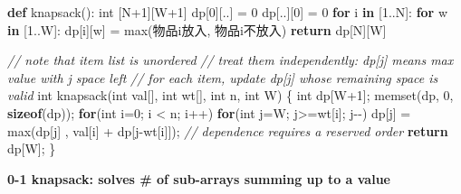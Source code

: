\documentclass[
]{article}
\newenvironment{Shaded}{}{}
\newcommand{\BuiltInTok}[1]{#1}
\newcommand{\CommentTok}[1]{\textcolor[rgb]{0.38,0.63,0.69}{\textit{#1}}}
\newcommand{\ControlFlowTok}[1]{\textcolor[rgb]{0.00,0.44,0.13}{\textbf{#1}}}
\newcommand{\DataTypeTok}[1]{\textcolor[rgb]{0.56,0.13,0.00}{#1}}
\newcommand{\DecValTok}[1]{\textcolor[rgb]{0.25,0.63,0.44}{#1}}
\newcommand{\FloatTok}[1]{\textcolor[rgb]{0.25,0.63,0.44}{#1}}
\newcommand{\KeywordTok}[1]{\textcolor[rgb]{0.00,0.44,0.13}{\textbf{#1}}}
\newcommand{\NormalTok}[1]{#1}
\newcommand{\OperatorTok}[1]{\textcolor[rgb]{0.40,0.40,0.40}{#1}}
\begin{document}
\begin{Shaded}
\begin{Highlighting}[]
\KeywordTok{def}\NormalTok{ knapsack():}
    \BuiltInTok{int}\NormalTok{ [N}\OperatorTok{+}\DecValTok{1}\NormalTok{][W}\OperatorTok{+}\DecValTok{1}\NormalTok{]}
\NormalTok{    dp[}\DecValTok{0}\NormalTok{][..] }\OperatorTok{=} \DecValTok{0}
\NormalTok{    dp[..][}\DecValTok{0}\NormalTok{] }\OperatorTok{=} \DecValTok{0}
    \ControlFlowTok{for}\NormalTok{ i }\KeywordTok{in}\NormalTok{ [}\FloatTok{1.}\NormalTok{.N]:}
    	\ControlFlowTok{for}\NormalTok{ w }\KeywordTok{in}\NormalTok{ [}\FloatTok{1.}\NormalTok{.W]:}
\NormalTok{    		dp[i][w] }\OperatorTok{=} \BuiltInTok{max}\NormalTok{(物品i放入, 物品i不放入)}
    \ControlFlowTok{return}\NormalTok{ dp[N][W]}
\end{Highlighting}
\end{Shaded}

\begin{Shaded}
\begin{Highlighting}[]
\CommentTok{// note that item list is unordered}
\CommentTok{// treat them independently: dp[j] means max value with j space left}
\CommentTok{// for each item, update dp[j] whose remaining space is valid }
\DataTypeTok{int}\NormalTok{ knapsack(}\DataTypeTok{int}\NormalTok{ val[], }\DataTypeTok{int}\NormalTok{ wt[], }\DataTypeTok{int}\NormalTok{ n, }\DataTypeTok{int}\NormalTok{ W)}
\NormalTok{\{}
    \DataTypeTok{int}\NormalTok{ dp[W+}\DecValTok{1}\NormalTok{];}
\NormalTok{    memset(dp, }\DecValTok{0}\NormalTok{, }\KeywordTok{sizeof}\NormalTok{(dp));}
    \ControlFlowTok{for}\NormalTok{(}\DataTypeTok{int}\NormalTok{ i=}\DecValTok{0}\NormalTok{; i \textless{} n; i++) }
        \ControlFlowTok{for}\NormalTok{(}\DataTypeTok{int}\NormalTok{ j=W; j\textgreater{}=wt[i]; j{-}{-})}
\NormalTok{            dp[j] = max(dp[j] , val[i] + dp[j{-}wt[i]]);  }\CommentTok{// dependence requires a reserved order }
    \ControlFlowTok{return}\NormalTok{ dp[W];}
\NormalTok{\}}
\end{Highlighting}
\end{Shaded}

\textbf{0-1 knapsack: solves \# of sub-arrays summing up to a value}
\end{document}
